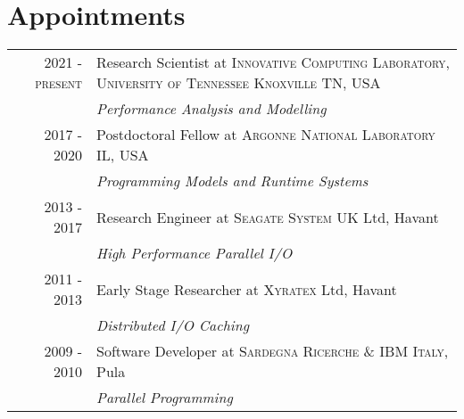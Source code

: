 \documentclass[a4paper,10pt]{article}
\begin{document}
\section{Appointments}
\begin{tabular}{rp{11cm}}
\textsc{2021 - present} & Research Scientist at \textsc{Innovative Computing Laboratory, University of Tennessee Knoxville} TN, USA \\
         & \emph{Performance Analysis and Modelling} \\

\textsc{2017 - 2020} & Postdoctoral Fellow at \textsc{Argonne National Laboratory} IL, USA \\
         & \emph{Programming Models and Runtime Systems}\\

\textsc{2013 - 2017} & Research Engineer at \textsc{Seagate System UK} Ltd, Havant \\
         & \emph{High Performance Parallel I/O}\\

\textsc{2011 - 2013} & Early Stage Researcher at \textsc{Xyratex} Ltd, Havant \\
         & \emph{Distributed I/O Caching}\\

\textsc{2009 - 2010} & Software Developer at \textsc{Sardegna Ricerche \& IBM Italy}, Pula \\
         & \emph{Parallel Programming}
\end{tabular}

%
\end{document}
